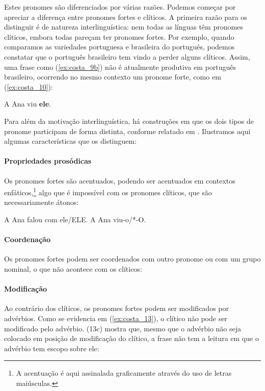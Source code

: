 \documentclass[output=paper]{LSP/langsci}
\begin{document}
Estes pronomes são diferenciados por várias razões. Podemos começar por apreciar a diferença entre pronomes fortes e clíticos. A primeira razão para os distinguir é de natureza interlinguística: nem todas as línguas têm pronomes clíticos, embora todas pareçam ter pronomes fortes. Por exemplo, quando comparamos as variedades portuguesa e brasileira do português, podemos constatar que o português brasileiro tem vindo a perder alguns clíticos. Assim, uma frase como (\ref{ex:costa_9b}) não é atualmente produtiva em português brasileiro, ocorrendo no mesmo contexto um pronome forte, como em (\ref{ex:costa_10}):

\ea\label{ex:costa_10}
A Ana viu \textbf{ele}.
\z

Para além da motivação interlinguística, há construções em que os dois tipos de pronome participam de forma distinta, conforme relatado em \citet{cardinalettistarke1994}. Ilustramos aqui algumas características que os distinguem:

\paragraph*{Propriedades prosódicas}
Os pronomes fortes são acentuados, podendo ser acentuados em contextos enfáticos,\footnote{A acentuação é aqui assinalada graficamente através do uso de letras maiúsculas.} algo que é impossível com os pronomes clíticos, que são necessariamente átonos:

\ea\label{ex:costa_11}
\ea\label{ex:costa_11a} A Ana falou com ele/ELE.
\ex\label{ex:costa_11b} A Ana viu-o/*-O.
\zl
\paragraph*{Coordenação}
Os pronomes fortes podem ser coordenados com outro pronome ou com um grupo nominal, o que não acontece com os clíticos:

\ea\label{ex:costa_12}
\zl

\paragraph*{Modificação}
Ao contrário dos clíticos, os pronomes fortes podem ser modificados por advérbios. Como se evidencia em (\ref{ex:costa_13}), o clítico não pode ser modificado pelo advérbio. (13c) mostra que, mesmo que o advérbio não seja colocado em posição de modificação do clítico, a frase não tem a leitura em que o advérbio tem escopo sobre ele:
\end{document}
